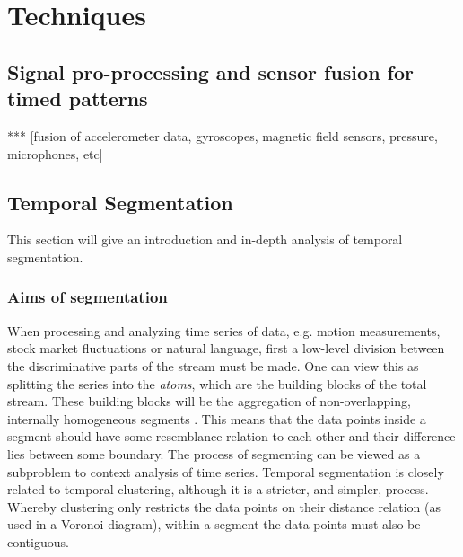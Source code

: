 
\chapter{Techniques} %

\label{Chapter2} %



\section{Signal pro-processing and sensor fusion for timed patterns}

*** [fusion of accelerometer data, gyroscopes, magnetic field sensors,
pressure, microphones, etc]

\section{Temporal Segmentation}

This section will give an introduction and in-depth analysis of temporal
segmentation.

\subsection{Aims of segmentation}
When processing and analyzing time series of data, e.g. motion measurements,
stock market fluctuations or natural language, first a low-level division
between the discriminative parts of the stream must be made. One can view this
as splitting the series into the \emph{atoms}, which are the building blocks
of the total stream. These building blocks will be the aggregation of
non-overlapping, internally homogeneous segments \cite{himberg2001time}. This
means that the data points inside a segment should have some resemblance
relation to each other and their difference lies between some boundary. The
process of segmenting can be viewed as a subproblem to context analysis of
time series. Temporal segmentation is closely related to temporal clustering,
although it is a stricter, and simpler, process. Whereby clustering only
restricts the data points on their distance relation (as used in a Voronoi
diagram), within a segment the data points must also be contiguous.

